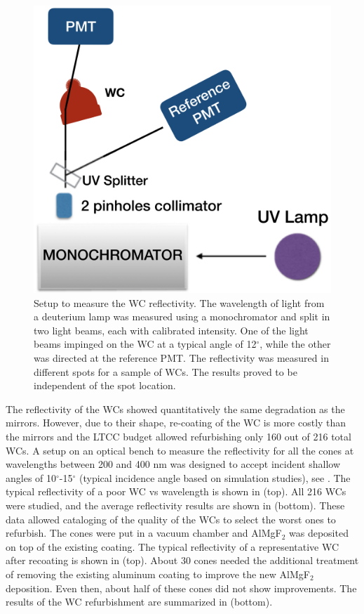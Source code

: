 \begin{figure}
	\centering
	\includegraphics[width=0.98\columnwidth,keepaspectratio]{img/wcSetup.png}
	\caption{Setup to measure the WC reflectivity. The wavelength of light from a deuterium lamp was measured using a monochromator and split in two
            light beams, each with calibrated intensity. One of the light beams impinged on the WC at a typical angle of 12$^{\circ}$,
            while the other was directed at the reference PMT. The reflectivity was measured in different spots for a sample of WCs.  The results proved
            to be independent of the spot location. }
	\label{fig:wcSetup}
\end{figure}

The reflectivity of the WCs showed quantitatively the same degradation as the mirrors. However, due to their shape, re-coating of the WC is more costly
than the mirrors and the LTCC budget allowed refurbishing only 160 out of 216 total WCs.
A setup on an optical bench to measure the reflectivity for all the cones at wavelengths between 200 and 400 nm was designed to
accept incident shallow angles of 10$^{\circ}$-15$^{\circ}$ (typical incidence angle based on simulation studies), see .
The typical reflectivity of a poor WC vs wavelength is shown in  (top).
All 216 WCs were studied, and the average reflectivity results are shown in  (bottom).
These data allowed cataloging of the quality of the WCs to select the worst ones to refurbish.
The cones were put in a vacuum chamber and AlMgF$_2$ was deposited on top of the existing coating.
The typical reflectivity of a representative WC after recoating is shown in  (top).
About 30 cones needed the additional treatment of removing the existing aluminum coating to improve the new AlMgF$_2$ deposition.
Even then, about half of these cones did not show improvements.
The results of the WC refurbishment are summarized in  (bottom).


